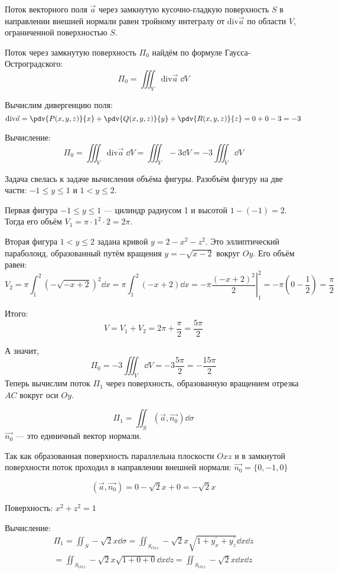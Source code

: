 \begin{theorem}
Поток векторного поля \(\vec{a}\) через
замкнутую кусочно-гладкую поверхность \(S\)
в направлении внешней нормали равен тройному интегралу от
\(\mathrm{div} \vec{a}\) по области \(V\),
ограниченной поверхностью \(S\).
\end{theorem}

Поток через замкнутую поверхность \(\Pi_0\)
найдём по формуле Гаусса-Остроградского:
\[ \Pi_{0} = \iiint_{V} \mathrm{div} \vec{a} \; \dd V \]

Вычислим дивергенцию поля:
\[
  \mathrm{div} \vec{a}
  = \pdv{P(x, y, z)}{x} + \pdv{Q(x, y, z)}{y} + \pdv{R(x, y, z)}{z}
  = 0 + 0 - 3 = -3
\]

Вычисление:
\[
  \Pi_0
  = \iiint_{V} \mathrm{div} \vec{a} \; \dd V
  = \iiint_{V} -3 \dd V
  = -3 \iiint_{V} \dd V
\]

Задача свелась к задаче вычисления объёма фигуры.
Разобъём фигуру на две части: \(-1 \leq y \leq 1\) и \(1 < y \leq 2\).

Первая фигура \(-1 \leq y \leq 1\) --- цилиндр радиусом 1
и высотой \(1 - (-1) = 2\).
Тогда его объём \(V_1 = \pi \cdot 1^2 \cdot 2 = 2 \pi\).

Вторая фигура \(1 < y \leq 2\) задана кривой
\(y = 2 - x^2 - z^2\).
Это эллиптический параболоид, образованный путём вращения
\(y = -\sqrt{x - 2}\) вокруг \(Oy\).
Его объём равен:
\[
  V_2 = \pi \int_{1}^{2} {\left(-\sqrt{-x + 2}\right)}^2 \dd x
  = \pi \int_{1}^{2} (-x + 2) \dd x
  = -\pi \left. \frac{{(-x + 2)}^2}{2}\right\rvert_{1}^{2}
  = -\pi \left(0 - \frac{1}{2}\right)
  = \frac{\pi}{2}
\]

Итого:
\[V = V_1 + V_2 = 2 \pi + \frac{\pi}{2} = \frac{5 \pi}{2}\]

А значит,
\[\Pi_0 = -3 \iiint_{V} \dd V = -3 \frac{5 \pi}{2} = -\frac{15 \pi}{2}\]
Теперь вычислим поток \(\Pi_{1}\) через поверхность,
образованную вращением отрезка \(AC\) вокруг оси \(Oy\).

\[
    \Pi_{1} = \iint_{S} (\vec{a}, \vec{n_{0}}) \dd \sigma
\]
\(\vec{n_0}\) --- это единичный вектор нормали.

Так как образованная поверхность параллельна плоскости \(Oxz\)
и в замкнутой поверхности поток проходил в направлении внешней нормали:
\(\Vec{n_{0}} = \{0,-1,0\}\)

\[(\vec{a}, \vec{n_{0}}) = 0 - \sqrt{2}x + 0 = -\sqrt{2}x\]

Поверхность: \(x^2 + z^2 = 1\)

Вычисление:
\[
\begin{split}
  \Pi_{1} = \iint_{S} -\sqrt{2}x \dd \sigma
    = \iint_{S_{Oxz}} -\sqrt{2}x
      \sqrt{1 + y_{x}^\prime + y_{z}^\prime} \dd x \dd z \\
    = \iint_{S_{Oxz}} -\sqrt{2}x \sqrt{1 + 0 + 0} \dd x \dd z
    = \iint_{S_{Oxz}} -\sqrt{2}x \dd x \dd z
\end{split}
\]

